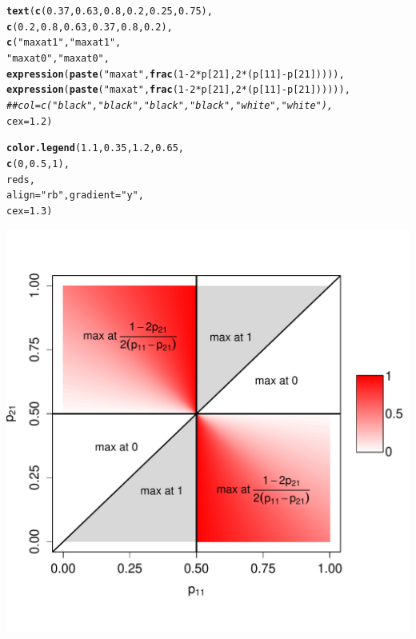 \documentclass{article}\usepackage[]{graphicx}\usepackage[]{color}
\makeatletter
\def\maxwidth{ %
  \ifdim\Gin@nat@width>\linewidth
    \linewidth
  \else
    \Gin@nat@width
  \fi
}
\newcommand{\hlnum}[1]{\textcolor[rgb]{0.686,0.059,0.569}{#1}}%
\newcommand{\hlstr}[1]{\textcolor[rgb]{0.192,0.494,0.8}{#1}}%
\newcommand{\hlcom}[1]{\textcolor[rgb]{0.678,0.584,0.686}{\textit{#1}}}%
\newcommand{\hlopt}[1]{\textcolor[rgb]{0,0,0}{#1}}%
\newcommand{\hlstd}[1]{\textcolor[rgb]{0.345,0.345,0.345}{#1}}%
\newcommand{\hlkwc}[1]{\textcolor[rgb]{0.333,0.667,0.333}{#1}}%
\newcommand{\hlkwd}[1]{\textcolor[rgb]{0.737,0.353,0.396}{\textbf{#1}}}%
\newenvironment{kframe}{%
 \def\at@end@of@kframe{}%
 \ifinner\ifhmode%
  \def\at@end@of@kframe{\end{minipage}}%
  \begin{minipage}{\columnwidth}%
 \fi\fi%
 \def\FrameCommand##1{\hskip\@totalleftmargin \hskip-\fboxsep
 \colorbox{shadecolor}{##1}\hskip-\fboxsep
     \hskip-\linewidth \hskip-\@totalleftmargin \hskip\columnwidth}%
 \MakeFramed {\advance\hsize-\width
   \@totalleftmargin\z@ \linewidth\hsize
   \@setminipage}}%
 {\par\unskip\endMakeFramed%
 \at@end@of@kframe}
\newenvironment{knitrout}{}{} %
\makeatother
\begin{document}
\begin{knitrout}
\begin{kframe}
\begin{alltt}
\hlkwd{text}\hlstd{(}\hlkwd{c}\hlstd{(}\hlnum{0.37}\hlstd{,} \hlnum{0.63}\hlstd{,} \hlnum{0.8}\hlstd{,} \hlnum{0.2}\hlstd{,} \hlnum{0.25}\hlstd{,} \hlnum{0.75}\hlstd{),}
     \hlkwd{c}\hlstd{(}\hlnum{0.2}\hlstd{,} \hlnum{0.8}\hlstd{,} \hlnum{0.63}\hlstd{,} \hlnum{0.37}\hlstd{,} \hlnum{0.8}\hlstd{,} \hlnum{0.2}\hlstd{),}
     \hlkwd{c}\hlstd{(}\hlstr{"max at 1"}\hlstd{,} \hlstr{"max at 1"}\hlstd{,}
       \hlstr{"max at 0"}\hlstd{,} \hlstr{"max at 0"}\hlstd{,}
       \hlkwd{expression}\hlstd{(}\hlkwd{paste}\hlstd{(}\hlstr{"max at "}\hlstd{,} \hlkwd{frac}\hlstd{(}\hlnum{1}\hlopt{-}\hlnum{2}\hlopt{*}\hlstd{p[}\hlnum{21}\hlstd{],}\hlnum{2}\hlopt{*}\hlstd{(p[}\hlnum{11}\hlstd{]}\hlopt{-}\hlstd{p[}\hlnum{21}\hlstd{])))),}
       \hlkwd{expression}\hlstd{(}\hlkwd{paste}\hlstd{(}\hlstr{"max at "}\hlstd{,} \hlkwd{frac}\hlstd{(}\hlnum{1}\hlopt{-}\hlnum{2}\hlopt{*}\hlstd{p[}\hlnum{21}\hlstd{],}\hlnum{2}\hlopt{*}\hlstd{(p[}\hlnum{11}\hlstd{]}\hlopt{-}\hlstd{p[}\hlnum{21}\hlstd{]))))),}
     \hlcom{##col=c("black","black","black","black","white","white"),}
     \hlkwc{cex}\hlstd{=}\hlnum{1.2}\hlstd{)}

\hlkwd{color.legend}\hlstd{(}\hlnum{1.1}\hlstd{,}\hlnum{0.35}\hlstd{,}\hlnum{1.2}\hlstd{,}\hlnum{0.65}\hlstd{,}
             \hlkwd{c}\hlstd{(}\hlnum{0}\hlstd{,}\hlnum{0.5}\hlstd{,}\hlnum{1}\hlstd{),}
             \hlstd{reds,}
             \hlkwc{align}\hlstd{=}\hlstr{"rb"}\hlstd{,}\hlkwc{gradient}\hlstd{=}\hlstr{"y"}\hlstd{,}
             \hlkwc{cex}\hlstd{=}\hlnum{1.3}\hlstd{)}
\end{alltt}
\end{kframe}
\includegraphics[width=\maxwidth]{../figs/Fig2-1} 

\end{knitrout}
\end{document}
